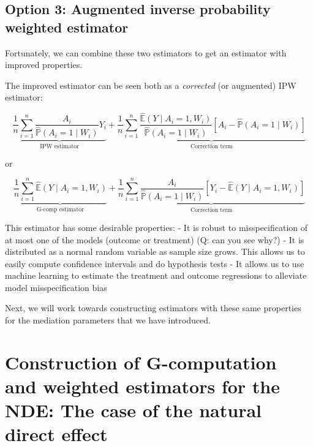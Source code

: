 \documentclass[
  12pt,
]{book}
\theoremstyle{definition}
\theoremstyle{definition}
\theoremstyle{definition}
\renewcommand{\P}{\mathbb{P}}
\newcommand{\E}{\mathbb{E}}
\newcommand{\1}{\mathbbm{1}}
\begin{document}
\hypertarget{option-3-augmented-inverse-probability-weighted-estimator}{%
\section{Option 3: Augmented inverse probability weighted estimator}\label{option-3-augmented-inverse-probability-weighted-estimator}}

Fortunately, we can combine these two estimators to get an estimator with
improved properties.

The improved estimator can be seen both as a \emph{corrected} (or augmented) IPW
estimator:

\begin{equation*}
\underbrace{\frac{1}{n} \sum_{i=1}^n \frac{A_i}{\hat{\P}(A_i=1 \mid W_i)}
Y_i}_{\text{IPW estimator}} +
\underbrace{\frac{1}{n} \sum_{i=1}^n \frac{\hat{\E}(Y \mid A_i=1, W_i)}
  {\hat{\P}(A_i=1 \mid W_i)}[A_i - \hat{\P}(A_i=1 \mid
  W_i)]}_{\text{Correction term}}
\end{equation*}

or

\begin{equation*}
\underbrace{\frac{1}{n} \sum_{i=1}^n \hat{\E}(Y \mid A_i=1,
  W_i)}_{\text{G-comp estimator}} +
\underbrace{\frac{1}{n} \sum_{i=1}^n \frac{A_i}{\hat{\P}(A_i=1\mid W_i)}
  [Y_i - \hat{\E}(Y \mid A_i=1, W_i)]}_{\text{Correction term}}
\end{equation*}

This estimator has some desirable properties:
- It is robust to misspecification of at most one of the models (outcome or
treatment) (Q: can you see why?)
- It is distributed as a normal random variable as sample size grows. This
allows us to easily compute confidence intervals and do hypothesis tests
- It allows us to use machine learning to estimate the treatment and outcome
regressions to alleviate model misspecification bias

Next, we will work towards constructing estimators with these same properties
for the mediation parameters that we have introduced.

\hypertarget{construction-of-g-computation-and-weighted-estimators-for-the-nde-the-case-of-the-natural-direct-effect}{%
\chapter{Construction of G-computation and weighted estimators for the NDE: The case of the natural direct effect}\label{construction-of-g-computation-and-weighted-estimators-for-the-nde-the-case-of-the-natural-direct-effect}}
\end{document}

